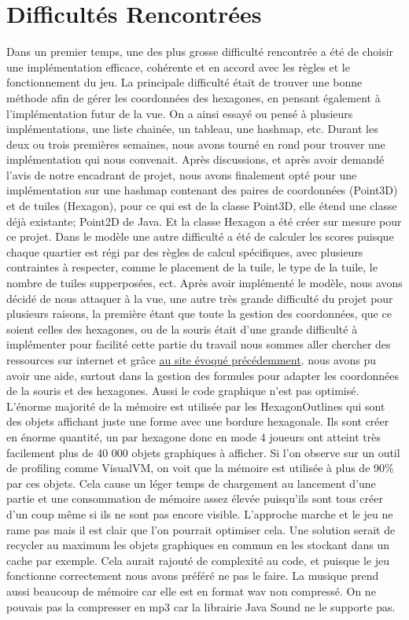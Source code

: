 \documentclass{article}
\begin{document}
    \section{Difficultés Rencontrées}\label{sec:difficultes-rencontrees}

    Dans un premier temps, une des plus grosse difficulté rencontrée a été de choisir une implémentation efficace, cohérente et en accord avec les règles et le fonctionnement du jeu.
    La principale difficulté était de trouver une bonne méthode afin de gérer les coordonnées des hexagones, en pensant également à l'implémentation futur de la vue.
    On a ainsi essayé ou pensé à plusieurs implémentations, une liste chainée, un tableau, une hashmap, etc.
    Durant les deux ou trois premières semaines, nous avons tourné en rond pour trouver une implémentation qui nous convenait.
    Après discussions, et après avoir demandé l'avis de notre encadrant de projet, nous avons finalement opté pour une implémentation sur une hashmap contenant des paires de coordonnées (Point3D) et de tuiles (Hexagon), pour ce qui est de la classe Point3D, elle étend une classe déjà existante; Point2D de Java.
    Et la classe Hexagon a été créer sur mesure pour ce projet.
    Dans le modèle une autre difficulté a été de calculer les scores puisque chaque quartier est régi par des règles de calcul spécifiques, avec plusieurs contraintes à respecter, comme le placement de la tuile, le type de la tuile, le nombre de tuiles supperposées, ect.
    Après avoir implémenté le modèle, nous avons décidé de nous attaquer à la vue, une autre très grande difficulté du projet pour plusieurs raisons, 
    la première étant que toute la gestion des coordonnées, que ce soient celles des hexagones, ou de la souris était d'une grande difficulté à implémenter pour facilité cette partie du travail nous sommes aller chercher des ressources sur internet et grâce \href{https://www.redblobgames.com/grids/hexagons/}{au site évoqué précédemment}.
    nous avons pu avoir une aide, surtout dans la gestion des formules pour adapter les coordonnées de la souris et des hexagones.
    Aussi le code graphique n'est pas optimisé. L'énorme majorité de la mémoire est utilisée par les HexagonOutlines qui sont des objets affichant juste une forme avec une bordure hexagonale.
    Ils sont créer en énorme quantité, un par hexagone donc en mode 4 joueurs ont atteint très facilement plus de 40 000 objets graphiques à afficher.
    Si l'on observe sur un outil de profiling comme VisualVM, on voit que la mémoire est utilisée à plus de 90\% par ces objets.
    Cela cause un léger temps de chargement au lancement d'une partie et une consommation de mémoire assez élevée puisqu'ils sont tous créer d'un coup même si ils ne sont pas encore visible.
    L'approche marche et le jeu ne rame pas mais il est clair que l'on pourrait optimiser cela. Une solution serait de recycler au maximum les objets graphiques en commun en les stockant dans un cache par exemple.
    Cela aurait rajouté de complexité au code, et puisque le jeu fonctionne correctement nous avons préféré ne pas le faire.
    La musique prend aussi beaucoup de mémoire car elle est en format wav non compressé.
    On ne pouvais pas la compresser en mp3 car la librairie Java Sound ne le supporte pas.
\end{document}
